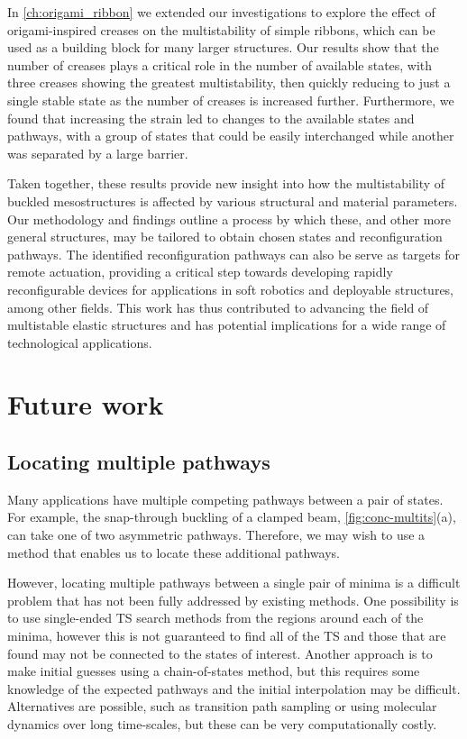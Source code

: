 In \cref{ch:origami_ribbon} we extended our investigations to explore the effect of origami-inspired creases on the multistability of simple ribbons, which can be used as a building block for many larger structures.
Our results show that the number of creases plays a critical role in the number of available states, with three creases showing the greatest multistability, then quickly reducing to just a single stable state as the number of creases is increased further.
Furthermore, we found that increasing the strain led to changes to the available states and pathways, with a group of states that could be easily interchanged while another was separated by a large barrier.

Taken together, these results provide new insight into how the multistability of buckled mesostructures is affected by various structural and material parameters.
Our methodology and findings outline a process by which these, and other more general structures, may be tailored to obtain chosen states and reconfiguration pathways.
The identified reconfiguration pathways can also be serve as targets for remote actuation, providing a critical step towards developing rapidly reconfigurable devices for applications in soft robotics and deployable structures, among other fields.
This work has thus contributed to advancing the field of multistable elastic structures and has potential implications for a wide range of technological applications.



\section{Future work}
\subsection{Locating multiple pathways}
Many applications have multiple competing pathways between a pair of states.
For example, the snap-through buckling of a clamped beam, \cref{fig:conc-multits}(a), can take one of two asymmetric pathways.
Therefore, we may wish to use a method that enables us to locate these additional pathways.

However, locating multiple pathways between a single pair of minima is a difficult problem that has not been fully addressed by existing methods.
One possibility is to use single-ended TS search methods from the regions around each of the minima, however this is not guaranteed to find all of the TS and those that are found may not be connected to the states of interest.
Another approach is to make initial guesses using a chain-of-states method, but this requires some knowledge of the expected pathways and the initial interpolation may be difficult.
Alternatives are possible, such as transition path sampling \cite{Bolhuis2002} or using molecular dynamics over long time-scales, but these can be very computationally costly.

